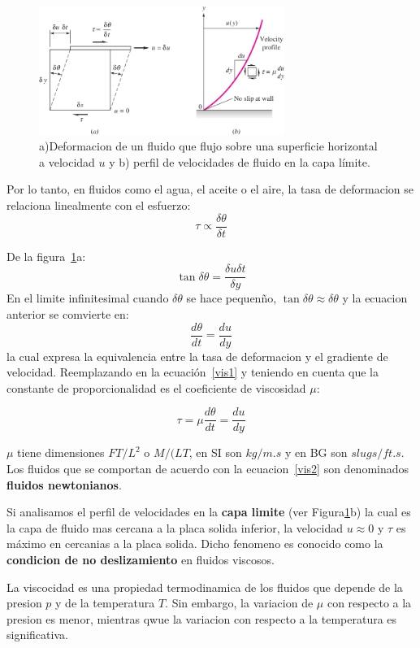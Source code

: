 \documentclass[10pt, oneside]{article}
\begin{document}
\begin{figure}[h]
\centering
\includegraphics[width=8cm]{visco}
\caption{a)Deformacion de un fluido que flujo sobre una superficie horizontal a velocidad $u$ y  b) perfil de velocidades de fluido en la capa l\'imite.}
\label{visco}
\end{figure}

Por lo tanto, en fluidos como el agua, el aceite o el aire, la tasa de deformacion se relaciona linealmente con el esfuerzo:
\begin{equation}
\tau \propto \frac{\delta \theta}{\delta t}
\label{vis1}
\end{equation}

De la figura~\ref{visco}a:
$$
\tan \delta \theta = \frac{\delta u \delta t}{\delta y}
$$
En el limite infinitesimal cuando $\delta \theta$ se hace pequen\~no, $\tan \delta \theta \approx \delta \theta$ y la ecuacion anterior se comvierte en:
$$
\frac{d\theta}{dt}=\frac{du}{dy}
$$
la cual expresa la equivalencia entre la tasa de deformacion y el gradiente de velocidad. Reemplazando en la ecuaci\'on~\ref{vis1} y teniendo en cuenta que la constante de proporcionalidad es el coeficiente de viscosidad $\mu$:

\begin{equation}
\tau = \mu \frac{d \theta}{d t} = \frac{d u}{d y}
\label{vis2}
\end{equation}

$\mu$ tiene dimensiones ${FT/L^2}$ o ${M/(LT}$, en SI son $kg/m.s$ y en BG son $slugs/ft.s$. Los fluidos que se comportan de acuerdo con la ecuacion~\ref{vis2} son denominados \textbf{fluidos newtonianos}.

Si analisamos el perfil de velocidades en la \textbf{capa limite} (ver Figura\ref{visco}b) la cual es la capa de fluido mas cercana a la placa solida inferior, la velocidad $u \approx 0$ y $\tau$ es m\'aximo en cercanias a la placa solida. Dicho fenomeno es conocido como la \textbf{condicion de no deslizamiento} en fluidos viscosos. 

La viscocidad es una propiedad termodinamica de los fluidos que depende de la presion $p$ y de la temperatura $T$. Sin embargo, la variacion de $\mu$ con respecto a la presion es menor, mientras qwue la variacion con respecto a la temperatura es significativa.
\end{document}
